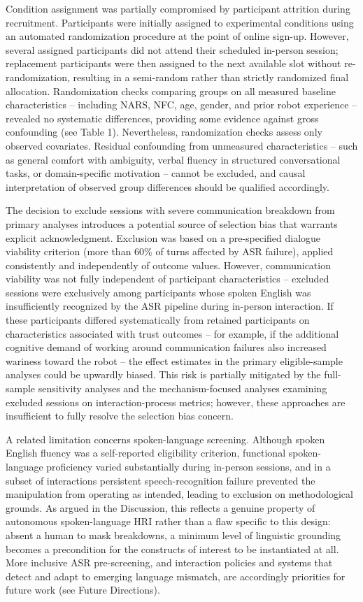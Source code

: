 \documentclass[
  authoryear,
  doubleblind,
  3p]{elsarticle}
\begin{document}
Condition assignment was partially compromised by participant attrition
during recruitment. Participants were initially assigned to experimental
conditions using an automated randomization procedure at the point of
online sign-up. However, several assigned participants did not attend
their scheduled in-person session; replacement participants were then
assigned to the next available slot without re-randomization, resulting
in a semi-random rather than strictly randomized final allocation.
Randomization checks comparing groups on all measured baseline
characteristics -- including NARS, NFC, age, gender, and prior robot
experience -- revealed no systematic differences, providing some
evidence against gross confounding (see Table 1). Nevertheless,
randomization checks assess only observed covariates. Residual
confounding from unmeasured characteristics -- such as general comfort
with ambiguity, verbal fluency in structured conversational tasks, or
domain-specific motivation -- cannot be excluded, and causal
interpretation of observed group differences should be qualified
accordingly.

The decision to exclude sessions with severe communication breakdown
from primary analyses introduces a potential source of selection bias
that warrants explicit acknowledgment. Exclusion was based on a
pre-specified dialogue viability criterion (more than 60\% of turns
affected by ASR failure), applied consistently and independently of
outcome values. However, communication viability was not fully
independent of participant characteristics -- excluded sessions were
exclusively among participants whose spoken English was insufficiently
recognized by the ASR pipeline during in-person interaction. If these
participants differed systematically from retained participants on
characteristics associated with trust outcomes -- for example, if the
additional cognitive demand of working around communication failures
also increased wariness toward the robot -- the effect estimates in the
primary eligible-sample analyses could be upwardly biased. This risk is
partially mitigated by the full-sample sensitivity analyses and the
mechanism-focused analyses examining excluded sessions on
interaction-process metrics; however, these approaches are insufficient
to fully resolve the selection bias concern.

A related limitation concerns spoken-language screening. Although spoken
English fluency was a self-reported eligibility criterion, functional
spoken-language proficiency varied substantially during in-person
sessions, and in a subset of interactions persistent speech-recognition
failure prevented the manipulation from operating as intended, leading
to exclusion on methodological grounds. As argued in the Discussion,
this reflects a genuine property of autonomous spoken-language HRI
rather than a flaw specific to this design: absent a human to mask
breakdowns, a minimum level of linguistic grounding becomes a
precondition for the constructs of interest to be instantiated at all.
More inclusive ASR pre-screening, and interaction policies and systems
that detect and adapt to emerging language mismatch, are accordingly
priorities for future work (see Future Directions).
\end{document}
